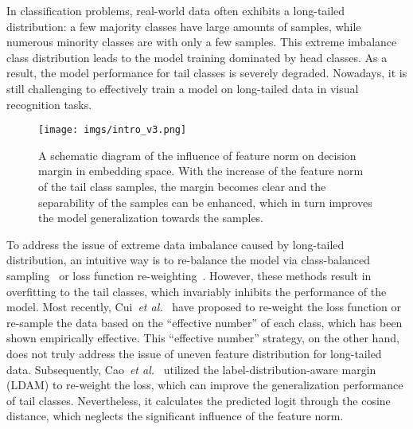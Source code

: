 \documentclass{article}
\def\etal{\emph{et al.}}
\begin{document}
In classification problems, real-world data often exhibits a long-tailed distribution: a few majority classes have large amounts of samples, while numerous minority classes are with only a few samples. This extreme imbalance class distribution leads to the model training dominated by head classes. As a result, the model performance for tail classes is severely degraded. Nowadays, it is still challenging to effectively train a model on long-tailed data in visual recognition tasks.

\begin{figure}[t]
	\centering
	\texttt{[image: imgs/intro\_v3.png]}
	\vspace{-12pt}
	\caption{A schematic diagram of the influence of feature norm on decision margin in embedding space. With the increase of the feature norm of the tail class samples, the margin becomes clear and the separability of the samples can be enhanced, which in turn improves the model generalization towards the samples.
}\label{fig:intro}
	\vspace{-12pt}
\end{figure}

To address the issue of extreme data imbalance caused by long-tailed distribution, an intuitive way is to re-balance the model via class-balanced sampling~\cite{he2008adasyn, kang2020decoupling} or loss function re-weighting~\cite{Huang2016CVPR, Salman2018Cost}. However, these methods result in overfitting to the tail classes, which invariably inhibits the performance of the model. Most recently, Cui~\etal~\cite{cui2019class} have proposed to re-weight the loss function or re-sample the data based on the ``effective number'' of each class, which has been shown empirically effective. This ``effective number'' strategy, on the other hand, does not truly address the issue of uneven feature distribution for long-tailed data. Subsequently, Cao~\etal~\cite{cao2019learning} utilized the label-distribution-aware margin (LDAM) to re-weight the loss, which can improve the generalization performance of tail classes. Nevertheless, it calculates the predicted logit through the cosine distance, which neglects the significant influence of the feature norm.
\end{document}
